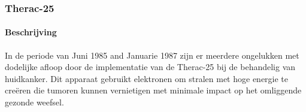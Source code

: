 \documentclass{article}
\begin{document}
	
	\subsubsection{Therac-25}
	\paragraph{Beschrijving}
	In de periode van Juni 1985 and Januarie 1987 zijn er meerdere ongelukken met dodelijke afloop door de implementatie van de Therac-25 bij de behandelig van huidkanker.
	Dit apparaat gebruikt elektronen om stralen met hoge energie te creëren die tumoren kunnen vernietigen met minimale impact op het omliggende gezonde weefsel.
	
\end{document}
